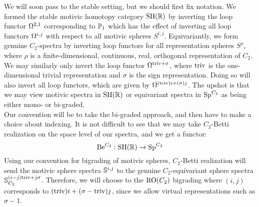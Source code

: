We will soon pass to the stable setting, but we should first fix notation.
We formed the stable motivic homotopy category $ \SH(\R) $ by inverting the loop functor $ \Loop^{2, 1} $ corresponding to $ \P_1 $ which has the effect of inverting all loop functors $ \Loop^{i, j} $ with respect to all motivic spheres $ S^{i, j} $.
Equivariantly, we form genuine $ C_2 $-spectra by inverting loop functors for all representation spheres $ S^\rho $, where $ \rho $ is a finite-dimensional, continuous, real, orthogonal representation of $ C_2 $.
We may similarly only invert the loop functor $ \Loop^{\triv + \sigma} $, where $ \triv $ is the one-dimensional trivial representation and $ \sigma $ is the sign representation.
Doing so will also invert all loop functors, which are given by $ \Loop^{(\triv)i + (\sigma)j} $.
The upshot is that we may view motivic spectra in $ \SH(\R) $ or equivariant spectra in $ \SpCt $ as being either mono- or bi-graded.
\\

Our convention will be to take the bi-graded approach, and then have to make a choice about indexing.
It is not difficult to see that we may take $ C_2 $-Betti realization on the space level of our spectra, and we get a functor:
$$ \BeCt: \SH(\R) \to \SpCt $$
Using our convention for bigrading of motivic spheres, $ C_2 $-Betti realization will send the motivic sphere spectra $ \Sph^{i, j} $ to the genuine $ C_2 $-equivariant sphere spectra $ \Sph_{C_2}^{(i-j)\triv + j \sigma} $.
Therefore, we will choose to the $ \RO(C_2) $ bigrading where $ (i, j) $ corresponds to $ (\triv)i + (\sigma - \triv)j $, since we allow virtual representations such as $ \sigma - 1 $.
\\

